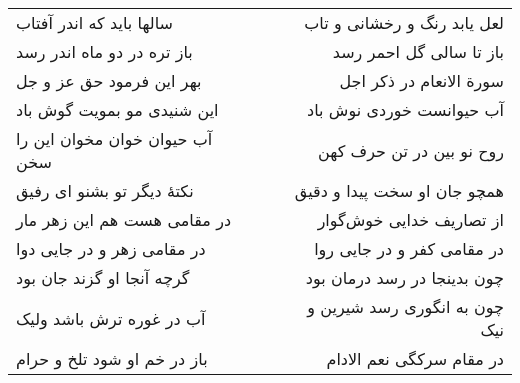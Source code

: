 \begin{center}
\begin{longtable}{l p{0.5cm} r}
سالها باید که اندر آفتاب
&&
لعل یابد رنگ و رخشانی و تاب
\\
باز تره در دو ماه اندر رسد
&&
باز تا سالی گل احمر رسد
\\
بهر این فرمود حق عز و جل
&&
سورة الانعام در ذکر اجل
\\
این شنیدی مو بمویت گوش باد
&&
آب حیوانست خوردی نوش باد
\\
آب حیوان خوان مخوان این را سخن
&&
روح نو بین در تن حرف کهن
\\
نکتهٔ دیگر تو بشنو ای رفیق
&&
همچو جان او سخت پیدا و دقیق
\\
در مقامی هست هم این زهر مار
&&
از تصاریف خدایی خوش‌گوار
\\
در مقامی زهر و در جایی دوا
&&
در مقامی کفر و در جایی روا
\\
گرچه آنجا او گزند جان بود
&&
چون بدینجا در رسد درمان بود
\\
آب در غوره ترش باشد ولیک
&&
چون به انگوری رسد شیرین و نیک
\\
باز در خم او شود تلخ و حرام
&&
در مقام سرکگی نعم الادام
\\
\end{longtable}
\end{center}
